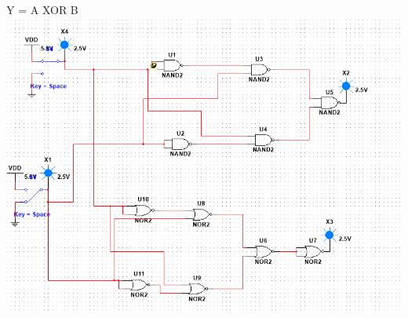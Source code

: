 \documentclass[12pt,a4paper]{article}
\begin{document}
Y = A XOR B\\
\includegraphics[width=\textwidth]{1e4}
\end{document}
